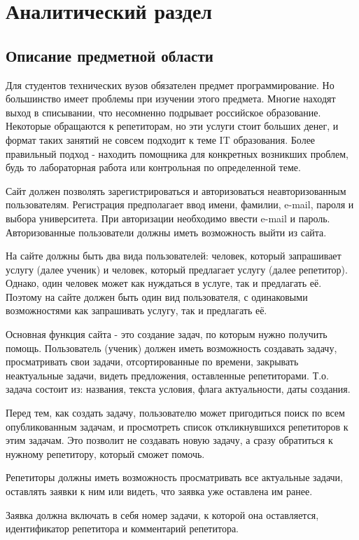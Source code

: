\chapter{Аналитический раздел}

\section{Описание предметной области}
Для студентов технических вузов обязателен предмет программирование. Но большинство имеет проблемы при изучении этого предмета. Многие находят выход в списывании, что несомненно подрывает российское образование. Некоторые обращаются к репетиторам, но эти услуги стоит больших денег, и формат таких занятий не совсем подходит к теме IT образования. Более правильный подход - находить помощника для конкретных возникших проблем, будь то лабораторная работа или контрольная по определенной теме.

Сайт должен позволять зарегистрироваться и авторизоваться неавторизованным пользователям. Регистрация предполагает ввод имени, фамилии, e-mail, пароля и выбора университета. При авторизации необходимо ввести e-mail и пароль.
Авторизованные пользователи должны иметь возможность выйти из сайта.

На сайте должны быть два вида пользователей: человек, который запрашивает услугу (далее ученик) и человек, который предлагает услугу (далее репетитор). Однако, один человек может как нуждаться в услуге, так и предлагать её. Поэтому на сайте должен быть один вид пользователя, с одинаковыми возможностями как запрашивать услугу, так и предлагать её.

Основная функция сайта - это создание задач, по которым нужно получить помощь. Пользователь (ученик) должен иметь возможность создавать задачу, просматривать свои задачи, отсортированные по времени, закрывать неактуальные задачи, видеть предложения, оставленные репетиторами. Т.о. задача состоит из: названия, текста условия, флага актуальности, даты создания.

Перед тем, как создать задачу, пользователю может пригодиться поиск по всем опубликованным задачам, и просмотреть список откликнувшихся репетиторов к этим задачам.  Это позволит не создавать новую задачу, а сразу обратиться к нужному репетитору, который сможет помочь.

Репетиторы должны иметь возможность просматривать все актуальные задачи, оставлять заявки к ним или видеть, что заявка уже оставлена им ранее.

Заявка должна включать в себя номер задачи, к которой она оставляется, идентификатор репетитора и комментарий репетитора.

